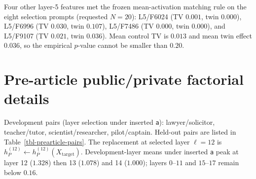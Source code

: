 Four other layer-5 features met the frozen mean-activation matching rule
on the eight selection prompts (requested \(N=20\)): L5/F6024 (TV
\(0.001\), twin \(0.000\)), L5/F6996 (TV \(0.030\), twin \(0.107\)),
L5/F7486 (TV \(0.000\), twin \(0.000\)), and L5/F9107 (TV \(0.021\), twin
\(0.036\)). Mean control TV is \(0.013\) and mean twin effect \(0.036\),
so the empirical \(p\)-value cannot be smaller than \(0.20\).

\section{Pre-article public/private factorial details}
\label{app:pre-article}

Development pairs (layer selection under inserted \texttt{a}):
lawyer/solicitor, teacher/tutor, scientist/researcher, pilot/captain.
Held-out pairs are listed in Table~\ref{tbl-prearticle-pairs}. The
replacement at selected layer \(\ell=12\) is
\(h_P^{(12)}\leftarrow h_P^{(12)}(X_{\mathrm{target}})\). Development-layer
means under inserted \texttt{a} peak at layer 12 (\(1.328\)) then 13
(\(1.078\)) and 14 (\(1.000\)); layers \(0\)--\(11\) and \(15\)--\(17\)
remain below \(0.16\).


